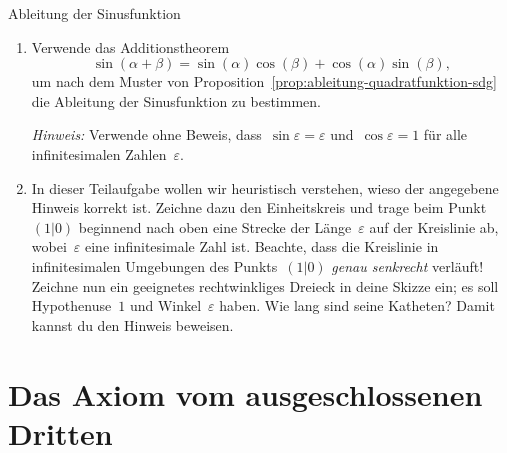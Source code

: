 \documentclass[twoside]{../zirkelblatt}
\theoremstyle{definition}
\theoremstyle{plain}
\theoremstyle{remark}
\begin{document}
\begin{aufgabeShaded}{Ableitung der Sinusfunktion}
\begin{enumerate}
\item Verwende das Additionstheorem
\[ \sin(\alpha+\beta) = \sin(\alpha)\cos(\beta) + \cos(\alpha)\sin(\beta), \]
um nach dem Muster von Proposition~\ref{prop:ableitung-quadratfunktion-sdg} die
Ableitung der Sinusfunktion zu bestimmen.

\emph{Hinweis:} Verwende ohne Beweis, dass~$\sin\varepsilon = \varepsilon$
und~$\cos\varepsilon = 1$ für alle infinitesimalen Zahlen~$\varepsilon$.

\item In dieser Teilaufgabe wollen wir heuristisch verstehen, wieso der
angegebene Hinweis korrekt ist. Zeichne dazu den Einheitskreis und trage beim
Punkt~$(1|0)$ beginnend nach oben eine Strecke der Länge~$\varepsilon$ auf der
Kreislinie ab, wobei~$\varepsilon$ eine infinitesimale Zahl ist. Beachte, dass
die Kreislinie in infinitesimalen Umgebungen des Punkts~$(1|0)$ \emph{genau
senkrecht} verläuft! Zeichne nun ein geeignetes rechtwinkliges Dreieck in deine
Skizze ein; es soll Hypothenuse~$1$ und Winkel~$\varepsilon$ haben. Wie lang
sind seine Katheten? Damit kannst du den Hinweis beweisen.
\end{enumerate}
\end{aufgabeShaded}



\section{Das Axiom vom ausgeschlossenen Dritten}
\label{sect:lem}
\end{document}
